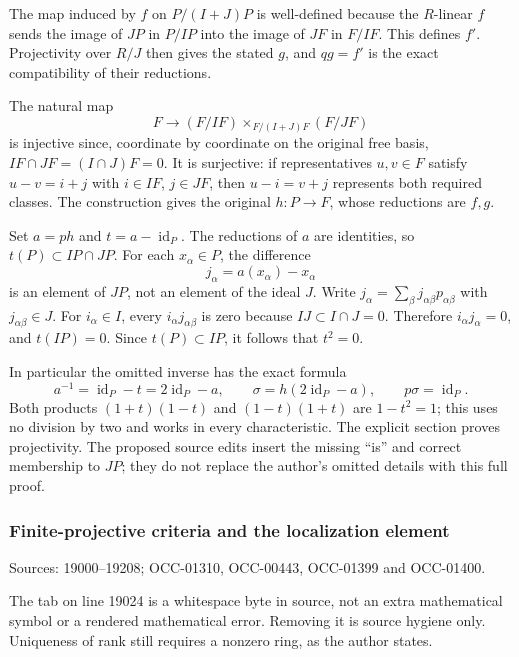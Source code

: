 The map induced by \(f\) on \(P/(I+J)P\) is well-defined because the \(R\)-linear \(f\) sends the image of \(JP\) in \(P/IP\) into the image of \(JF\) in \(F/IF\). This defines \(f'\). Projectivity over \(R/J\) then gives the stated \(g\), and \(qg=f'\) is the exact compatibility of their reductions.

The natural map \[
F\longrightarrow(F/IF)\times_{F/(I+J)F}(F/JF)
\] is injective since, coordinate by coordinate on the original free basis, \(IF\cap JF=(I\cap J)F=0\). It is surjective: if representatives \(u,v\in F\) satisfy \(u-v=i+j\) with \(i\in IF\), \(j\in JF\), then \(u-i=v+j\) represents both required classes. The construction gives the original \(h:P\to F\), whose reductions are \(f,g\).

Set \(a=ph\) and \(t=a-\operatorname{id}_P\). The reductions of \(a\) are identities, so \(t(P)\subset IP\cap JP\). For each \(x_\alpha\in P\), the difference \[
j_\alpha=a(x_\alpha)-x_\alpha
\] is an element of \(JP\), not an element of the ideal \(J\). Write \(j_\alpha=\sum_\beta j_{\alpha\beta}p_{\alpha\beta}\) with \(j_{\alpha\beta}\in J\). For \(i_\alpha\in I\), every \(i_\alpha j_{\alpha\beta}\) is zero because \(IJ\subset I\cap J=0\). Therefore \(i_\alpha j_\alpha=0\), and \(t(IP)=0\). Since \(t(P)\subset IP\), it follows that \(t^2=0\).

In particular the omitted inverse has the exact formula \[
a^{-1}=\operatorname{id}_P-t=2\operatorname{id}_P-a,
\qquad
\sigma=h(2\operatorname{id}_P-a),\qquad p\sigma=\operatorname{id}_P.
\] Both products \((1+t)(1-t)\) and \((1-t)(1+t)\) are \(1-t^2=1\); this uses no division by two and works in every characteristic. The explicit section proves projectivity. The proposed source edits insert the missing ``is'' and correct membership to \(JP\); they do not replace the author's omitted details with this full proof.

\subsubsection{Finite-projective criteria and the localization element}\label{finite-projective-criteria-and-the-localization-element}

Sources: 19000--19208; OCC-01310, OCC-00443, OCC-01399 and OCC-01400.

The tab on line 19024 is a whitespace byte in source, not an extra mathematical symbol or a rendered mathematical error. Removing it is source hygiene only. Uniqueness of rank still requires a nonzero ring, as the author states.

